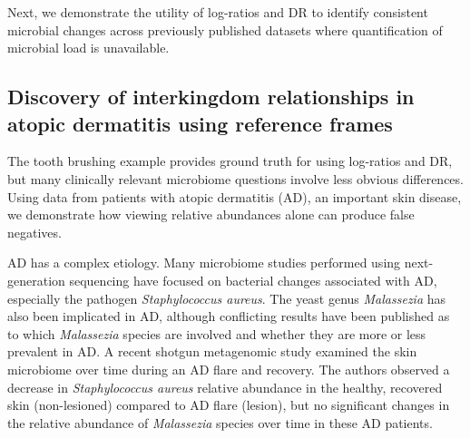 Next, we demonstrate the utility of log-ratios and DR to identify consistent microbial changes across previously published datasets where quantification of microbial load is unavailable.

\subsection{Discovery of interkingdom relationships in atopic dermatitis using reference frames}
The tooth brushing example provides ground truth for using log-ratios and DR, but many clinically relevant microbiome questions involve less obvious differences. Using data from patients with atopic dermatitis (AD), an important skin disease, we demonstrate how viewing relative abundances alone can produce false negatives.

AD has a complex etiology. Many microbiome studies performed using next-generation sequencing have focused on bacterial changes associated with AD, especially the pathogen \textit{Staphylococcus aureus}. The yeast genus \textit{Malassezia} has also been implicated in AD, although conflicting results have been published as to which \textit{Malassezia} species are involved and whether they are more or less prevalent in AD\cite{Glatz2015-ag}. A recent shotgun metagenomic study examined the skin microbiome over time during an AD flare and recovery. The authors observed a decrease in \textit{Staphylococcus aureus} relative abundance in the healthy, recovered skin (non-lesioned) compared to AD flare (lesion), but no significant changes in the relative abundance of \textit{Malassezia} species over time in these AD patients\cite{Byrd2017-eb}.

